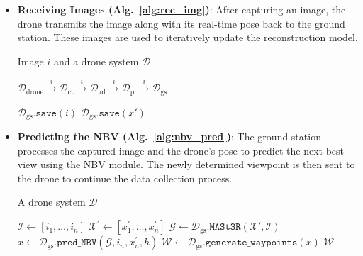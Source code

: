 \begin{itemize}
\begin{algorithm}[H]
\begin{algorithmic}[1]
    \State Continue
\EndWhile

\State $\mathcal{D}_\text{pi} \xrightarrow{\text{NBV\_reached}} \mathcal{D}_\text{gs}$ 
\State $i \gets \mathcal{D}_\text{drone}.\texttt{capture()}$
\State \Return $i$ 

\end{algorithmic}
\end{algorithm}
    
    \item \textbf{Receiving Images (Alg.~\ref{alg:rec_img})}: After capturing an image, the drone transmits the image along with its real-time pose back to the ground station. These images are used to iteratively update the reconstruction model.

\begin{algorithm}[H]
\caption{\textcolor[HTML]{069F48}{Receive Image}}
\label{alg:rec_img}
\begin{algorithmic}[1]
\Require Image $i$ and a drone system $\mathcal{D}$

\State $\mathcal{D}_\text{drone} 
\xrightarrow{i} \mathcal{D}_\text{ct} 
\xrightarrow{i} \mathcal{D}_\text{ad}
\xrightarrow{i} \mathcal{D}_\text{pi}
\xrightarrow{i} \mathcal{D}_\text{gs}$

\State $\mathcal{D}_\text{gs}.\texttt{save}(i)$ 
\State $\mathcal{D}_\text{gs}.\texttt{save}(x')$ 

\end{algorithmic}
\end{algorithm}

    \item \textbf{Predicting the NBV (Alg.~\ref{alg:nbv_pred})}: The ground station processes the captured image and the drone’s pose to predict the next-best-view using the NBV module. The newly determined viewpoint is then sent to the drone to continue the data collection process.

\begin{algorithm}[H]
\caption{\textcolor[HTML]{06AFF5}{NBV Prediction}}
\label{alg:nbv_pred}
\begin{algorithmic}[1]
\Require A drone system $\mathcal{D}$

\State $\mathcal{I} \gets [i_1, \dots, i_n]$ 
\State $\mathcal{X}^{'} \gets [x^{'}_{1}, \dots, x^{'}_{n}]$ 
\State $\mathcal{G} \gets \mathcal{D}_\text{gs}.\texttt{MASt3R}(\mathcal{X}', \mathcal{I})$ 
\State $x \gets \mathcal{D}_\text{gs}.\texttt{pred\_NBV}(\mathcal{G}, i_n, x^{'}_{n}, h)$ 
\State $\mathcal{W} \gets \mathcal{D}_\text{gs}.\texttt{generate\_waypoints}(x)$ 
\State \Return $\mathcal{W}$ 

\end{algorithmic}
\end{algorithm}
\end{itemize}

